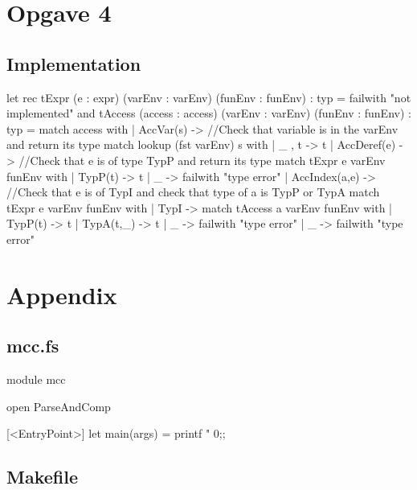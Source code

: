 \section{Opgave 4}
\subsection{Implementation}

\begin{fs}
let rec tExpr (e : expr) (varEnv : varEnv) (funEnv : funEnv) : typ =
    failwith "not implemented"
and tAccess (access : access) (varEnv : varEnv) (funEnv : funEnv) : typ =
    match access with
    | AccVar(s) -> 
      //Check that variable is in the varEnv and return its type
      match lookup (fst varEnv) s with
      | _ , t -> t
    | AccDeref(e) -> 
      //Check that e is of type TypP and return its type
      match tExpr e varEnv funEnv with
      | TypP(t) -> t
      | _ -> failwith "type error"
    | AccIndex(a,e) -> 
      //Check that e is of TypI and check that type of a is TypP or TypA
      match tExpr e varEnv funEnv with
      | TypI -> 
        match tAccess a varEnv funEnv with
        | TypP(t) -> t
        | TypA(t,_) -> t
        | _ -> failwith "type error"
      | _ -> failwith "type error"
\end{fs}

\pagebreak
\section{Appendix}
\subsection{mcc.fs}
\begin{fs}
module mcc

open ParseAndComp

[<EntryPoint>]
let main(args) =
    printf "%
    0;;
\end{fs}
\subsection{Makefile}

